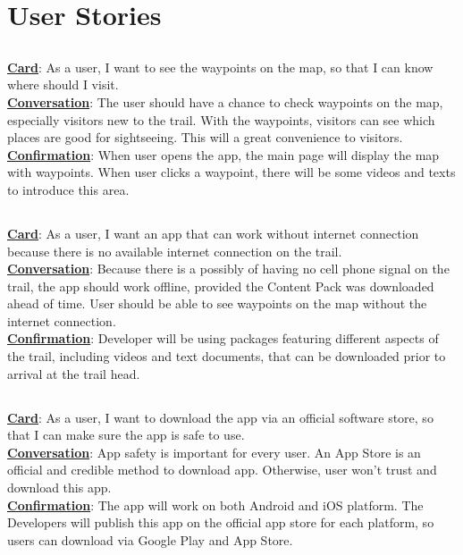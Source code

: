 \documentclass[letterpaper, 10pt,titlepage]{article}
\begin{document}
\section{User Stories}
\subsection{ }
\textbf{\underline{Card}}: As a user, I want to see the waypoints on the map, so that I can know where should I visit.\\ 
\textbf{\underline{Conversation}}: The user should have a chance to check waypoints on the map, especially visitors new to the trail. With the waypoints, visitors can see which places are good for sightseeing. This will a great convenience to visitors.\\
\textbf{\underline{Confirmation}}: When user opens the app, the main page will display the map with waypoints. When user clicks a waypoint, there will be some videos and texts to introduce this area.

\subsection{ }
\textbf{\underline{Card}}: As a user, I want an app that can work without internet connection because there is no available internet connection on the trail.\\
\textbf{\underline{Conversation}}: Because there is a possibly of having no cell phone signal on the trail, the app should work offline, provided the Content Pack was downloaded ahead of time. User should be able to see waypoints on the map without the internet connection.\\
\textbf{\underline{Confirmation}}: Developer will be using packages featuring different aspects of the trail, including videos and text documents, that can be downloaded prior to arrival at the trail head.
\subsection{ }
\textbf{\underline{Card}}: As a user, I want to download the app via an official software store, so that I can make sure the app is safe to use.\\
\textbf{\underline{Conversation}}: App safety is important for every user. An App Store is an official and credible method to download app. Otherwise, user won’t trust and download this app.\\
\textbf{\underline{Confirmation}}: The app will work on both Android and iOS platform. The Developers will publish this app on the official app store for each platform, so users can download via Google Play and App Store.
\end{document}
